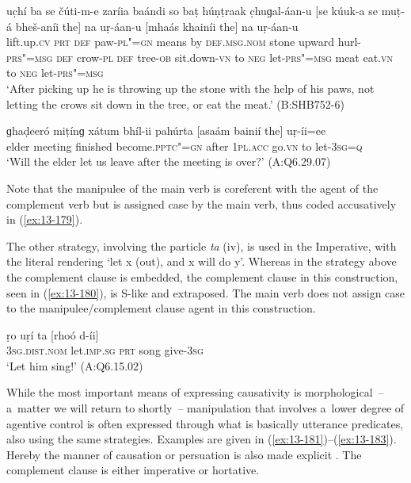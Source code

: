 \begin{exe}
\ex
\label{ex:13-178}
\gll uc̣hí ba se čúti-m-e zaríia baándi  so baṭ húṇṭraak c̣huɡal-áan-u [se kúuk-a se muṭ-á bheš-aníi the] na  uṛ-áan-u \textsc{[}mhaás
  khainíi the] na uṛ-áan-u \\
lift.up.\textsc{cv} \textsc{prt} \textsc{def} paw-\textsc{pl"=gn} means by  \textsc{def.msg.nom} stone upward hurl-\textsc{prs"=msg}  \textsc{def} crow-\textsc{pl} \textsc{def} tree-\textsc{ob} sit.down-\textsc{vn} to \textsc{neg} let-\textsc{prs"=msg} meat eat.\textsc{vn} to \textsc{neg} let-\textsc{prs"=msg} \\
\glt `After picking up he is throwing up the stone with the help of his paws, not letting the crows sit down in the tree, or eat the meat.' (B:SHB752-6)

\ex
\label{ex:13-179}
\gll ɡhaḍeeró miṭínɡ xátum bhíl-ii pahúrta [asaám  bainií the] uṛ-íi=ee \\
elder meeting finished become.\textsc{pptc"=gn} after \textsc{1pl.acc} go.\textsc{vn} to let-\textsc{3sg=q} \\
\glt `Will the elder let us leave after the meeting is over?' (A:Q6.29.07) 
\end{exe}

Note that the manipulee of the main verb is coreferent with the agent of the complement verb but is assigned case by the main verb, thus coded accusatively in (\ref{ex:13-179}).


The other strategy, involving the particle \textit{ta} (iv), is used in the Imperative, with the literal rendering `let x (out), and x will do y'. Whereas in the strategy above the complement clause is embedded, the complement clause in this construction, seen in (\ref{ex:13-180}), is S-like and extraposed. The main verb does not assign case to the manipulee/complement clause agent in this construction.

\begin{exe}
\ex
\label{ex:13-180}
\gll ṛo uṛí ta [rhoó d-íi] \\
\textsc{3sg.dist.nom} let.\textsc{imp.sg} \textsc{ prt} song give-\textsc{3sg} \\
\glt `Let him sing!' (A:Q6.15.02) 
\end{exe}

 While the most important means of expressing causativity is morphological~-- a~matter we will return to shortly~-- manipulation that involves a~lower degree of agentive control \citep[45]{givon2001b} is often expressed through what is basically utterance predicates, also using the same strategies. Examples are given in (\ref{ex:13-181})--(\ref{ex:13-183}). Hereby the manner of causation or persuation is also made explicit \citep[136]{noonan2007}. The complement clause is either imperative or hortative.

